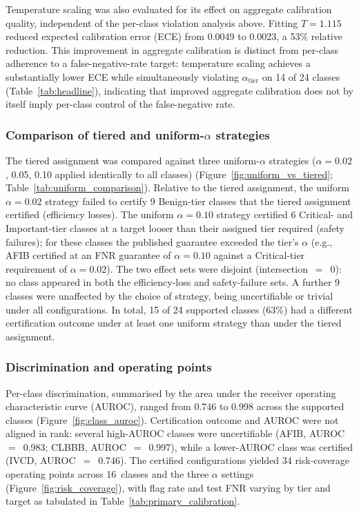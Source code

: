 Temperature scaling was also evaluated for its effect on aggregate calibration
quality, independent of the per-class violation analysis above.
Fitting $T{=}1.115$ reduced expected calibration error (ECE) from 0.0049 to 0.0023,
a 53\% relative reduction.
This improvement in aggregate calibration is distinct from per-class adherence to a
false-negative-rate target: temperature scaling achieves a substantially lower ECE
while simultaneously violating $\alpha_\mathrm{tier}$ on 14 of 24 classes
(Table~\ref{tab:headline}), indicating that improved aggregate calibration does not
by itself imply per-class control of the false-negative rate.

\subsubsection{Comparison of tiered and uniform-$\alpha$ strategies}

The tiered assignment was compared against three uniform-$\alpha$ strategies
($\alpha{=}0.02$, 0.05, 0.10 applied identically to all classes)
(Figure~\ref{fig:uniform_vs_tiered}; Table~\ref{tab:uniform_comparison}).
Relative to the tiered assignment, the uniform $\alpha{=}0.02$ strategy failed to
certify 9 Benign-tier classes that the tiered assignment certified (efficiency
losses).
The uniform $\alpha{=}0.10$ strategy certified 6 Critical- and Important-tier
classes at a target looser than their assigned tier required (safety failures);
for these classes the published guarantee exceeded the tier's $\alpha$
(e.g., AFIB certified at an FNR guarantee of $\alpha{=}0.10$ against a
Critical-tier requirement of $\alpha{=}0.02$).
The two effect sets were disjoint (intersection~$=$~0): no class appeared in both
the efficiency-loss and safety-failure sets.
A further 9 classes were unaffected by the choice of strategy, being uncertifiable
or trivial under all configurations.
In total, 15 of 24 supported classes (63\%) had a different certification outcome
under at least one uniform strategy than under the tiered assignment.

\subsubsection{Discrimination and operating points}

Per-class discrimination, summarised by the area under the receiver operating
characteristic curve (AUROC), ranged from 0.746 to 0.998 across the supported
classes (Figure~\ref{fig:class_auroc}).
Certification outcome and AUROC were not aligned in rank: several high-AUROC classes
were uncertifiable (AFIB, AUROC~$=$~0.983; CLBBB, AUROC~$=$~0.997), while a
lower-AUROC class was certified (IVCD, AUROC~$=$~0.746).
The certified configurations yielded 34 risk-coverage operating points across
16~classes and the three $\alpha$ settings (Figure~\ref{fig:risk_coverage}), with
flag rate and test FNR varying by tier and target as tabulated in
Table~\ref{tab:primary_calibration}.
